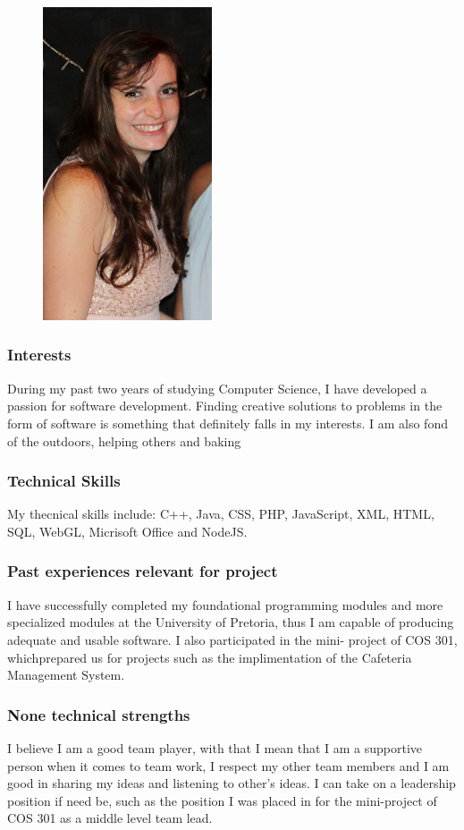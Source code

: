 \documentclass[hidelinks, 12pt, oneside]{article}
\begin{document}
\begin{figure}[ht!]
\centering
\includegraphics[width=50mm]{IsabelNel.jpg}
\end{figure}

\subsubsection{Interests}
During my past two years of studying Computer Science, I have developed a
passion for software development. Finding creative solutions to problems in
the form of software is something that definitely falls in my interests. I am
also fond of the outdoors, helping others and baking

\subsubsection{Technical Skills}
My thecnical skills include: C++, Java, CSS, PHP, JavaScript, XML, HTML,
SQL, WebGL, Micrisoft Office and NodeJS.

\subsubsection{Past experiences relevant for project}
I have successfully completed my foundational programming modules and
more specialized modules at the University of Pretoria, thus I am capable
of producing adequate and usable software. I also participated in the mini-
project of COS 301, whichprepared us for projects such as the implimentation of 
the Cafeteria Management System. 

\subsubsection{None technical strengths}
I believe I am a good team player, with that I mean that I am a supportive
person when it comes to team work, I respect my other team members and
I am good in sharing my ideas and listening to other's ideas. I can take on
a leadership position if need be, such as the position I was placed in for the
mini-project of COS 301 as a middle level team lead.
\end{document}
